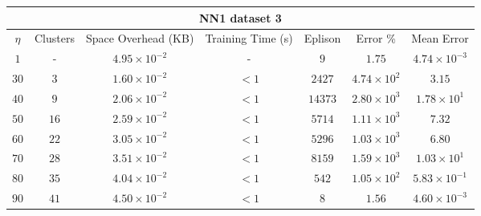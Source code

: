 \begin{adjustwidth}{-1cm}{}
\begin{tabular}{ccccccc}
\hline
\multicolumn{7}{c}{NN1 dataset 3} \\
\toprule
$\eta$ & Clusters & Space Overhead (KB) & Training Time (s) & Eplison & Error \% & Mean Error\\
\midrule
$1$ & - & $4.95 \times 10^{-2}$ & - & $9$ & $1.75$ & $4.74 \times 10^{-3}$\\
$30$ & $3$ & $1.60 \times 10^{-2}$ & $<1$ & $2427$ & $4.74 \times 10^2$ & $3.15$\\
$40$ & $9$ & $2.06 \times 10^{-2}$ & $<1$ & $14373$ & $2.80 \times 10^3$ & $1.78 \times 10^1$\\
$50$ & $16$ & $2.59 \times 10^{-2}$ & $<1$ & $5714$ & $1.11 \times 10^3$ & $7.32$\\
$60$ & $22$ & $3.05 \times 10^{-2}$ & $<1$ & $5296$ & $1.03 \times 10^3$ & $6.80$\\
$70$ & $28$ & $3.51 \times 10^{-2}$ & $<1$ & $8159$ & $1.59 \times 10^3$ & $1.03 \times 10^1$\\
$80$ & $35$ & $4.04 \times 10^{-2}$ & $<1$ & $542$ & $1.05 \times 10^2$ & $5.83 \times 10^{-1}$\\
$90$ & $41$ & $4.50 \times 10^{-2}$ & $<1$ & $8$ & $1.56$ & $4.60 \times 10^{-3}$\\
\bottomrule
\end{tabular}
\end{adjustwidth}

\par\null\par
\par\null\par

